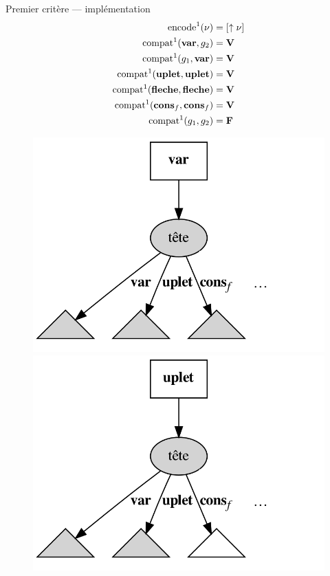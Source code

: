 \documentclass[serif]{beamer}
\begin{document}
\begin{frame}{Premier critère — implémentation}
\footnotesize
\begin{align*}
    \mathrm{encode}^1 (\nu) &=
    [ \uparrow \nu ]
  \\
    \mathrm{compat}^1 (\bold{var}, {g}_2) &=
    \bold{V}
  \\
    \mathrm{compat}^1 ({g}_1, \bold{var}) &=
    \bold{V}
  \\
    \mathrm{compat}^1 (\bold{uplet}, \bold{uplet}) &=
    \bold{V}
  \\
    \mathrm{compat}^1 (\bold{fleche}, \bold{fleche}) &=
    \bold{V}
  \\
    \mathrm{compat}^1 (\bold{cons}_f, \bold{cons}_f) &=
    \bold{V}
  \\
    \mathrm{compat}^1 ({g}_1, {g}_2) &=
    \bold{F}
\end{align*}
\begin{figure}[h]
  \centering
  \includegraphics[scale=0.12]{graphs/crit1_1}
  \includegraphics[scale=0.12]{graphs/crit1_2}

\end{figure}
\end{frame}
\end{document}
